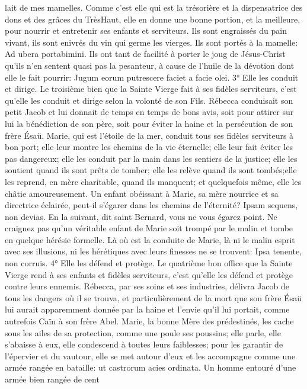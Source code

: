lait de mes mamelles. Comme c'est elle qui est la trésorière et la dispensatrice des dons et des grâces du TrèsHaut, elle en donne une bonne portion, et la meilleure, pour nourrir et entretenir ses enfants et serviteurs. Ils sont
engraissés du pain vivant, ils sont enivrés du vin qui germe les vierges. Ils sont portés à la mamelle: Ad ubera
portabimini. Ils ont tant de facilité à porter le joug de Jésus-Christ qu'ils n'en sentent quasi pas la pesanteur, à
cause de l'huile de la dévotion dont elle le fait pourrir: Jugum eorum putrescere faciet a facie olei.
3° Elle les conduit et dirige.
 Le troisième bien que la Sainte Vierge fait à ses fidèles serviteurs, c'est qu'elle les conduit et dirige selon la
volonté de son Fils. Rébecca conduisait son petit Jacob et lui donnait de temps en temps de bons avis, soit pour
attirer sur lui la bénédiction de son père, soit pour éviter la haine et la persécution de son frère Ésaü. Marie, qui est
l'étoile de la mer, conduit tous ses fidèles serviteurs à bon port; elle leur montre les chemins de la vie éternelle; elle
leur fait éviter les pas dangereux; elle les conduit par la main dans les sentiers de la justice; elle les soutient quand
ils sont prêts de tomber; elle les relève quand ils sont tombés;elle les reprend, en mère charitable, quand ils
manquent; et quelquefois même, elle les châtie amoureusement. Un enfant obéissant à Marie, sa mère nourrice et
sa directrice éclairée, peut-il s'égarer dans les chemins de l'éternité? Ipsam sequens, non devias. En la suivant, dit
saint Bernard, vous ne vous égarez point. Ne craignez pas qu'un véritable enfant de Marie soit trompé par le malin
et tombe en quelque hérésie formelle. Là où est la conduite de Marie, là ni le malin esprit avec ses illusions, ni les
hérétiques avec leurs finesses ne se trouvent: Ipsa tenente, non corruis.
4° Elle les défend et protège.
 Le quatrième bon office que la Sainte Vierge rend à ses enfants et fidèles serviteurs, c'est qu'elle les défend
et protège contre leurs ennemis. Rébecca, par ses soins et ses industries, délivra Jacob de tous les dangers où il
se trouva, et particulièrement de la mort que son frère Ésaü lui aurait apparemment donnée par la haine et l'envie
qu'il lui portait, comme autrefois Caïn à son frère Abel. Marie, la bonne Mère des prédestinés, les cache sous les
ailes de sa protection, comme une poule ses poussins; elle parle, elle s'abaisse à eux, elle condescend à toutes
leurs faiblesses; pour les garantir de l'épervier et du vautour, elle se met autour d'eux et les accompagne comme
une armée rangée en bataille: ut castrorum acies ordinata. Un homme entouré d'une armée bien rangée de cent
